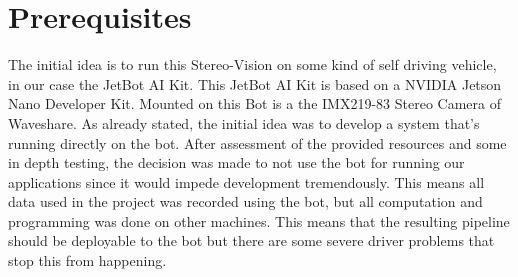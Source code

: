 \documentclass[journal,onecolumn]{IEEEtran}
\begin{document}
\section{Prerequisites}
\noindent The initial idea is to run this Stereo-Vision on some kind of self driving vehicle, in our case the JetBot AI Kit\cite{jetbot_wiki}. This JetBot AI Kit is based on a NVIDIA Jetson Nano Developer Kit\cite{nvidia_jetson}. Mounted on this Bot is a the IMX219-83 Stereo Camera\cite{cam_wiki} of Waveshare. As already stated, the initial idea was to develop a system that's running directly on the bot. After assessment of the provided resources and some in depth testing, the decision was made to not use the bot for running our applications since it would impede development tremendously. This means all data used in the project was recorded using the bot, but all computation and programming was done on other machines. This means that the resulting pipeline should be deployable to the bot but there are some severe driver problems that stop this from happening.
\end{document}
